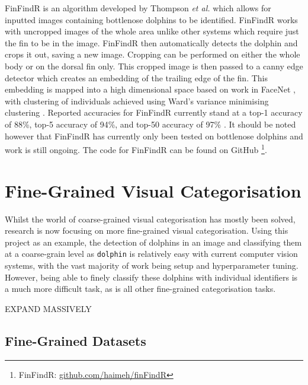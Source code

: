 FinFindR is an algorithm developed by Thompson \textit{et al. } which allows for inputted images containing bottlenose dolphins to be identified. FinFindR works with uncropped images of the whole area unlike other systems which require just the fin to be in the image. FinFindR then automatically detects the dolphin and crops it out, saving a new image. Cropping can be performed on either the whole body or on the dorsal fin only. This cropped image is then passed to a canny edge detector which creates an embedding of the trailing edge of the fin. This embedding is mapped into a high dimensional space based on work in FaceNet \cite{schroff_facenet_2015}, with clustering of individuals achieved using Ward's variance minimising clustering \cite{ward_hierarchical_1963}. Reported accuracies for FinFindR currently stand at a top-1 accuracy of 88\%, top-5 accuracy of 94\%, and top-50 accuracy of 97\% \cite{thompson_finfindrpdf_2019}. It should be noted however that FinFindR has currently only been tested on bottlenose dolphins and work is still ongoing. The code for FinFindR can be found on GitHub \footnote{FinFindR: \href{https://github.com/haimeh/finFindR}{github.com/haimeh/finFindR}}.



\section{Fine-Grained Visual Categorisation}\label{ch:Background,sec:Fine-grainedCV}

Whilst the world of coarse-grained visual categorisation has mostly been solved, research is now focusing on more fine-grained visual categorisation. Using this project as an example, the detection of dolphins in an image and classifying them at a coarse-grain level as \texttt{dolphin} is relatively easy with current computer vision systems, with the vast majority of work being setup and hyperparameter tuning. However, being able to finely classify these dolphins with individual identifiers is a much more difficult task, as is all other fine-grained categorisation tasks. 

EXPAND MASSIVELY 



\subsection{Fine-Grained Datasets}\label{ch:Background,sec:Fine-grainedCV,sub:FGDatasets}


